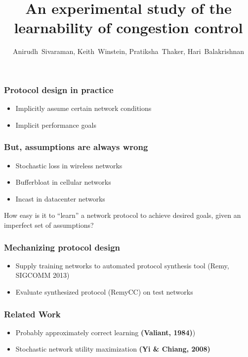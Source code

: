\documentclass[svgnames]{beamer}
\title{An experimental study of the learnability of congestion control}
\author{Anirudh~Sivaraman, Keith~Winstein, Pratiksha~Thaker, Hari~Balakrishnan}
\institute{MIT CSAIL\vspace{\baselineskip}}
\begin{document}
\begin{frame}

\titlepage

\end{frame}

\begin{Large}
\begin{frame}
\frametitle{Protocol design in practice}
\begin{itemize}
\item<2-> Implicitly assume certain network conditions
\item<3-> Implicit performance goals
\end{itemize}
\end{frame}

\begin{frame}
\frametitle{But, assumptions are always wrong}
\begin{itemize}
\item<2-> Stochastic loss in wireless networks
\item<3-> Bufferbloat in cellular networks
\item<4-> Incast in datacenter networks
\end{itemize}
\end{frame}

\begin{frame}
\begin{center}
How easy is it to “learn” a network protocol to achieve desired goals, given
an imperfect set of assumptions?
\end{center}
\end{frame}

\begin{frame}
\frametitle{Mechanizing protocol design}
\begin{itemize}
\item <2->Supply training networks to automated protocol synthesis tool (Remy, SIGCOMM 2013) 
\item <3->Evaluate synthesized protocol (RemyCC) on test networks
\end{itemize}
\end{frame}







 



\begin{frame}
\frametitle{Related Work}
\begin{itemize}
\item Probably approximately correct learning \textbf{(Valiant, 1984)})
\item Stochastic network utility maximization \textbf{(Yi \& Chiang, 2008)}
\end{itemize}
\end{frame}


\end{Large}
\end{document}
